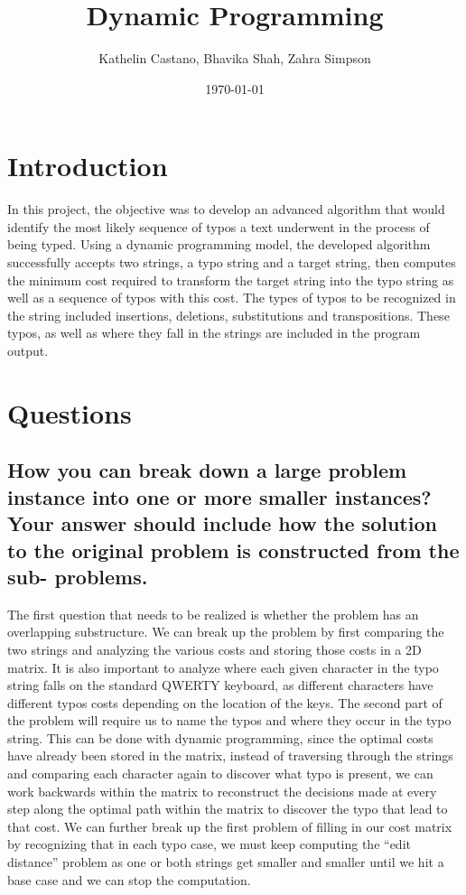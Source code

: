 \documentclass[letterpaper,12pt]{article}
\begin{document}
\title{\Huge\textbf{Dynamic Programming} }
\author{Kathelin Castano, Bhavika Shah, Zahra Simpson}
\date{\today}
\maketitle



\section{Introduction}

In this project, the objective was to develop an advanced algorithm that would identify the most likely sequence of typos a text underwent in the process of being typed. Using a dynamic programming model, the developed algorithm successfully accepts two strings, a typo string and a target string, then computes the minimum cost required to transform the target string into the typo string as well as a sequence of typos with this cost. The types of typos to be recognized in the string included insertions, deletions, substitutions and transpositions. These typos, as well as where they fall in the strings are included in the program output. 

\section{Questions}
\subsection{How you can break down a large problem instance into one or more smaller instances? Your answer should include how the solution to the original problem is constructed from the sub- problems.}The first question that needs to be realized is whether the problem has an overlapping substructure. We can break up the problem by first comparing the two strings and analyzing the various costs and storing those costs in a 2D matrix. It is also important to analyze where each given character in the typo string falls on the standard QWERTY keyboard, as different characters have different typos costs depending on the location of the keys. The second part of the problem will require us to name the typos and where they occur in the typo string. This can be done with dynamic programming, since the optimal costs have already been stored in the matrix, instead of traversing through the strings and comparing each character again to discover what typo is present, we can work backwards within the matrix to reconstruct the decisions made at every step along the optimal path within the matrix to discover the typo that lead to that cost. We can further break up the first problem of filling in our cost matrix by recognizing that in each typo case, we must keep computing the “edit distance” problem as one or both strings get smaller and smaller until we hit a base case and we can stop the computation. 
\end{document}

